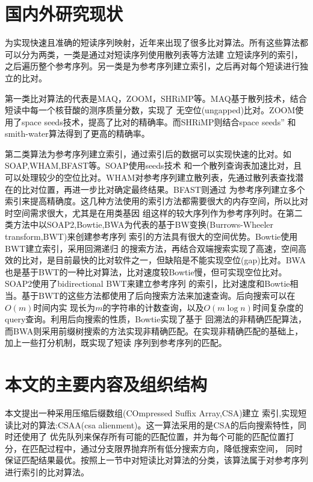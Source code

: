 \section{国内外研究现状}
为实现快速且准确的短读序列映射，近年来出现了很多比对算法。所有这些算法都可以分为两类，一类是通过对短读序列使用散列表等方法建
立短读序列的索引，之后遍历整个参考序列。另一类是为参考序列建立索引，之后再对每个短读进行独立的比对。

第一类比对算法的代表是MAQ，ZOOM，SHRiMP等。MAQ\cite{li2008mapping}基于散列技术，结合短读中每一个核苷酸的测序质量分数，实现了
无空位(ungapped)比对。ZOOM\cite{lin2008zoom}使用了space seeds技术，提高了比对的精确率。而SHRiMP\cite{rumble2009shrimp}则结合space seeds''
和smith-water算法得到了更高的精确率。

第二类算法为参考序列建立索引，通过索引后的数据可以实现快速的比对。如SOAP,WHAM,BFAST等。SOAP\cite{li2008soap}使用seeds技术
和一个散列查询表加速比对，且可以处理较少的空位比对。WHAM\cite{li2011wham}对参考序列建立散列表，先通过散列表查找潜在的比对位置，再进一步比对确定最终结果。BFAST则通过
为参考序列建立多个索引来提高精确度。这几种方法使用的索引方法都需要很大的内存空间，所以比对时空间需求很大，尤其是在用类基因
组这样的较大序列作为参考序列时。在第二类方法中以SOAP2,Bowtie,BWA为代表的基于BW变换(Burrows-Wheeler transform,BWT)\cite{ferragina2005indexing}来创建参考序列
索引的方法具有很大的空间优势。Bowtie\cite{langmead2009ultrafast}使用BWT建立索引，采用回溯递归
的搜索方法，再结合双端搜索实现了高速，空间高效的比对，是目前最快的比对软件之一，但缺陷是不能实现空位(gap)比对。BWA\cite{li2009fast}
也是基于BWT的一种比对算法，比对速度较Bowtie慢，但可实现空位比对。SOAP2\cite{li2009soap2}使用了bidirectional BWT来建立参考序列
的索引，比对速度和Bowtie相当。基于BWT的这些方法都使用了后向搜索方法\cite{lippert2005space}来加速查询。后向搜索可以在$O(m)$时间内实
现长为$m$的字符串的计数查询，以及$O(m\log n)$时间复杂度的query查询。利用后向搜索的性质，Bowtie实现了基于
回溯法的非精确匹配算法，而BWA则采用前缀树搜索的方法实现非精确匹配。在实现非精确匹配的基础上，加上一些打分机制，既实现了短读
序列到参考序列的匹配。

\section{本文的主要内容及组织结构}

本文提出一种采用压缩后缀数组(COmpressed Suffix Array,CSA)建立
索引\cite{grossi2005compressed},实现短读比对的算法:CSAA(csa alienment)。这一算法采用的是CSA的后向搜索特性，同时还使用了
优先队列来保存所有可能的匹配位置，并为每个可能的匹配位置打分，在匹配过程中，通过分支限界抛弃所有低分搜索方向，降低搜索空间，
同时保证匹配结果最优。按照上一节中对短读比对算法的分类，该算法属于对参考序列进行索引的比对算法。

